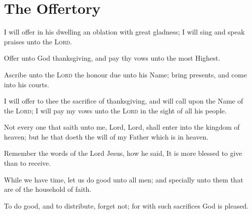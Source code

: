 \bigskip

\section{The Offertory}
\label{offertory}


I will offer in his dwelling an oblation with great gladness; I will sing and speak praises unto the {\scshape Lord}.

Offer unto God thanksgiving, and pay thy vows unto the most Highest.

Ascribe unto the {\scshape Lord} the honour due unto his Name; bring presents, and come into his courts.\par{}

I will offer to thee the sacrifice of thanksgiving, and will call upon the Name of the {\scshape Lord}; I will pay my vows unto the {\scshape Lord} in the sight of all his people.

Not every one that saith unto me, Lord, Lord, shall enter into the kingdom of heaven; but he that doeth the will of my Father which is in heaven. \ 

Remember the words of the Lord Jesus, how he said, It is more blessed to give than to receive.\par{}

While we have time, let us do good unto all men; and specially unto them that are of the household of faith.

To do good, and to distribute, forget not; for with such sacrifices God is pleased.

